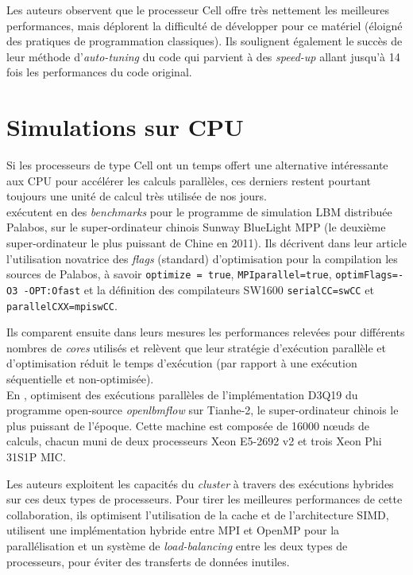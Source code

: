 Les auteurs observent que le processeur Cell offre très nettement les meilleures performances, mais déplorent la difficulté de développer pour ce matériel (éloigné des pratiques de programmation classiques). Ils soulignent également le succès de leur méthode d'\textit{auto-tuning} du code qui parvient à des \textit{speed-up} allant jusqu'à 14 fois les performances du code original.

\section{Simulations sur \acs{CPU}}
Si les processeurs de type Cell ont un temps offert une alternative intéressante aux \acs{CPU} pour accélérer les calculs parallèles, ces derniers restent pourtant toujours une unité de calcul très utilisée de nos jours.\\

\citet{min_performance_2013} exécutent en \citeyear{min_performance_2013} des \textit{benchmarks} pour le programme de simulation \acs{LBM} distribuée Palabos, sur le super-ordinateur chinois Sunway BlueLight MPP (le deuxième super-ordinateur le plus puissant de Chine en 2011). Ils décrivent dans leur article l'utilisation novatrice des \textit{flags} (standard) d'optimisation pour la compilation les sources de Palabos, à savoir \texttt{optimize = true}, \texttt{MPIparallel=true}, \texttt{optimFlags=-O3 -OPT:Ofast} et la définition des compilateurs SW1600 \texttt{serialCC=swCC} et \texttt{parallelCXX=mpiswCC}.

Ils comparent ensuite dans leurs mesures les performances relevées pour différents nombres de \textit{cores} utilisés et relèvent que leur stratégie d'exécution parallèle et d'optimisation réduit le temps d'exécution (par rapport à une exécution séquentielle et non-optimisée).\\

En \citeyear{li_parallelizing_2016}, \citet{li_parallelizing_2016} optimisent des exécutions parallèles de l'implémentation D3Q19 du programme open-source \textit{openlbmflow} sur Tianhe-2, le super-ordinateur chinois le plus puissant de l'époque. Cette machine est composée de 16000 nœuds de calculs, chacun muni de deux processeurs Xeon E5-2692 v2 et trois Xeon Phi 31S1P MIC.

Les auteurs exploitent les capacités du \textit{cluster} à travers des exécutions hybrides sur ces deux types de processeurs. Pour tirer les meilleures performances de cette collaboration, ils optimisent l'utilisation de la cache et de l'architecture SIMD, utilisent une implémentation hybride entre MPI et OpenMP pour la parallélisation et un système de \textit{load-balancing} entre les deux types de processeurs, pour éviter des transferts de données inutiles.

